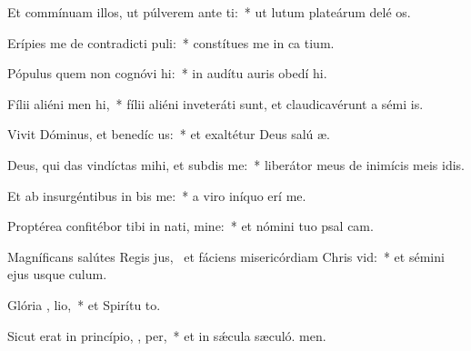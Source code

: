 \item Et commínuam illos, ut púlverem ante  ti:~* ut lutum plateárum delé os.
\item Erípies me de contradicti puli:~* constítues me in ca tium.
\item Pópulus quem non cognóvi  hi:~* in audítu auris obedí hi.
\item Fílii aliéni men  hi,~* fílii aliéni inveteráti sunt, et claudicavérunt a sémi is.
\item Vivit Dóminus, et benedíc  us:~* et exaltétur Deus salú æ.
\item Deus, qui das vindíctas mihi, et subdis   me:~* liberátor meus de inimícis meis idis.
\item Et ab insurgéntibus in  bis me:~* a viro iníquo erí me.
\item Proptérea confitébor tibi in nati, mine:~* et nómini tuo psal cam.
\item Magníficans salútes Regis jus,~\pscross{} et fáciens misericórdiam Chris  vid:~* et sémini ejus usque  culum.
\item Glória ,  lio,~* et Spirítu to.
\item Sicut erat in princípio,  ,  per,~* et in sǽcula sæculó. men.
